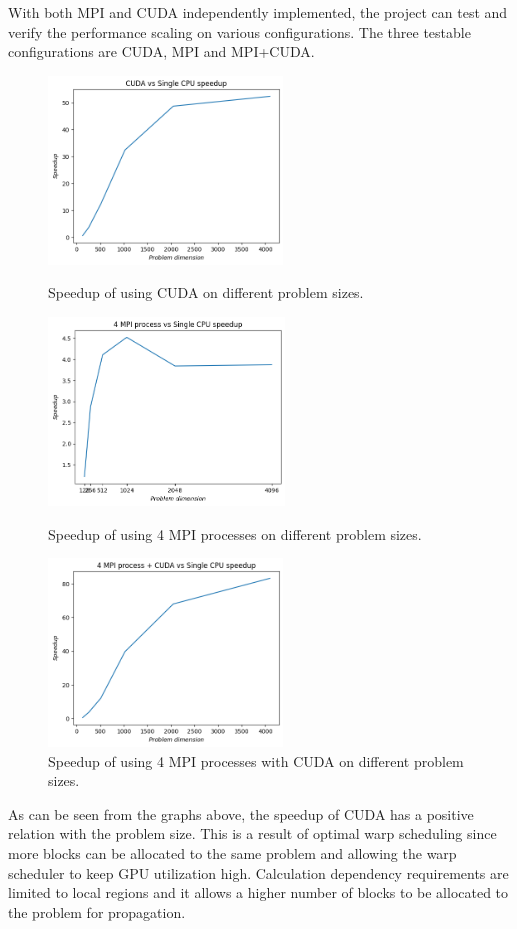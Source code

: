 With both MPI and CUDA independently implemented, the project can test and verify the performance scaling on various configurations. The three testable configurations are CUDA, MPI and MPI+CUDA.


\begin{figure}[!htb]
    \centering
    \includegraphics[height=5cm]{images/CUDA_speedup.png}
    \caption{Speedup of using CUDA on different problem sizes.}
    \endminipage\hfill
    \centering
    \includegraphics[height=5cm]{images/MPI_speedup.png}
    \caption{Speedup of using 4 MPI processes on different problem sizes.}
    \endminipage\hfill
    \centering
    \centering
    \includegraphics[height=5cm]{images/MPI_CUDA_speedup.png}
    \caption{Speedup of using 4 MPI processes with CUDA on different problem sizes.}
    \endminipage\hfill
\end{figure}

As can be seen from the graphs above, the speedup of CUDA has a positive relation with the problem size. This is a result of optimal warp scheduling since more blocks can be allocated to the same problem and allowing the warp scheduler to keep GPU utilization high. Calculation dependency requirements are limited to local regions and it allows a higher number of blocks to be allocated to the problem for propagation. 

